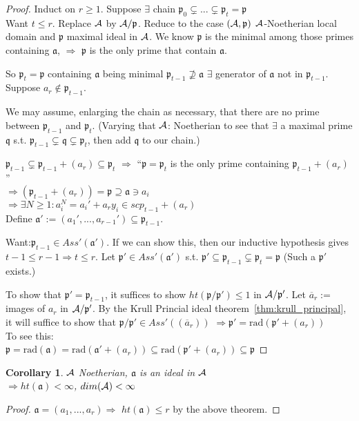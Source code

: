 \documentclass[11pt]{article}
\newtheorem{cor}[thm]{Corollary}
\newcommand{\sca}{{\mathfrak a}}
\newcommand{\scp}{{\mathfrak p}}
\newcommand{\scq}{\mathfrak q}
\newcommand{\cala}{{\cal A}}
\newcommand{\Lrta}{\Longrightarrow}
\begin{document}
\begin{proof}
Induct on $r\geq 1$. Suppose $\exists $ chain $\scp_0\subsetneq...\subsetneq\scp_t=\scp$\\
Want $t\leq r$. Replace $\cala$ by $\cala/\scp$. Reduce to the case $(\cala,\scp)$ $\cala$-Noetherian local domain and $\scp$ maximal ideal in $\cala$. We know $\scp$ is the minimal among those primes containing $\sca$, $\Lrta$ $\scp$ is the only prime that contain $\sca$.

So $\scp_t=\scp$ containing $\sca$ being minimal $\scp_{t-1}\nsupseteq\sca$ $\exists $ generator of $\sca$ not in $\scp_{t-1}$. Suppose $a_r\notin\scp_{t-1}$.

We may assume, enlarging the chain as necessary, that there are no prime between $\scp_{t-1}$ and $\scp_t$. (Varying that $\cala$: Noetherian to see that $\exists$ a maximal prime $\scq$ s.t. $\scp_{t-1}\subsetneq \scq\subsetneq \scp_t$, then add $\scq$ to our chain.)

$\scp_{t-1}\subsetneq \scp_{t-1}+(a_r)\subseteq\scp_t$ $\Lrta$ ``$\scp=\scp_t$ is the only prime containing $\scp_{t-1}+(a_r)$''\\
$\Lrta(\scp_{t-1}+(a_r))=\scp\supseteq \sca\ni a_i$\\
$\Lrta\exists N\geq 1: a_i^N=a_i'+a_r y_i\in scp_{t-1}+(a_r)$\\
Define $\sca':=(a_1',...,a_{r-1}')\subseteq \scp_{t-1}$.

Want:$\scp_{t-1}\in Ass'(\sca')$. If we can show this, then our inductive hypothesis gives $t-1\leq r-1\Lrta t\leq r$. Let $\scp'\in Ass'(\sca')$ s.t. $\scp'\subseteq \scp_{t-1}\subsetneq \scp_t=\scp$ (Such a $\scp'$ exists.)

To show that $\scp'=\scp_{t-1}$, it suffices to show $ht(\scp/\scp')\leq 1$ in $\cala/\scp'$. Let $\overline{a}_r:=$ images of $a_r$ in $\cala/\scp'$.
By the Krull Princial ideal theorem~\ref{thm:krull_principal}, it will suffice to show that 
$\scp/\scp'\in Ass'((\overline{a}_r))$ $\Lrta \scp'=\text{rad}(\scp'+(a_r))$\\
To see this:\\
$\scp=\text{rad}(\sca)=\text{rad}(\sca'+(a_r))\subseteq \text{rad}(\scp'+(a_r))\subseteq \scp$
\end{proof}
\begin{cor}
$\cala$ Noetherian, $\sca$ is an ideal in $\cala$\\
$\Lrta ht(\sca)<\infty$, $dim(\cala)<\infty$
\end{cor}
\begin{proof}
$\sca=(a_1,...,a_r)\Lrta$ $ht(\sca)\leq r$ by the above theorem.
\end{proof}
\end{document}
